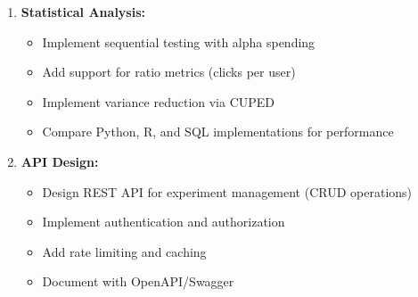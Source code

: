 \begin{enumerate}
    \item \textbf{Statistical Analysis:}
    \begin{itemize}
        \item Implement sequential testing with alpha spending
        \item Add support for ratio metrics (clicks per user)
        \item Implement variance reduction via CUPED
        \item Compare Python, R, and SQL implementations for performance
    \end{itemize}

    \item \textbf{API Design:}
    \begin{itemize}
        \item Design REST API for experiment management (CRUD operations)
        \item Implement authentication and authorization
        \item Add rate limiting and caching
        \item Document with OpenAPI/Swagger
    \end{itemize}
\end{enumerate}
